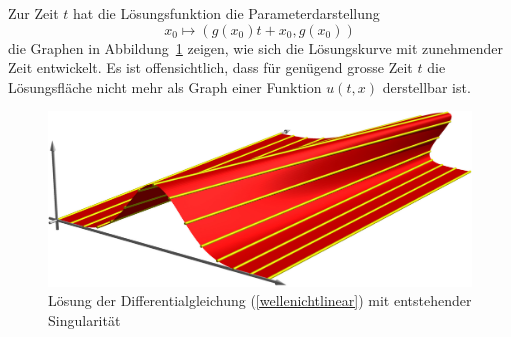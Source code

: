 Zur Zeit $t$ hat die Lösungsfunktion die Parameterdarstellung
\[
x_0\mapsto (g(x_0)t+x_0,g(x_0))
\]
die Graphen in Abbildung~\ref{g} zeigen, wie sich die Lösungskurve
mit zunehmender Zeit entwickelt.
Es ist offensichtlich, dass für genügend grosse Zeit $t$ die
Lösungsfläche nicht mehr als Graph einer Funktion $u(t,x)$ derstellbar ist.
\begin{figure}
\begin{center}
\includegraphics[width=\hsize]{../common/graphics/welle.jpg}
\end{center}
\caption{Lösung der Differentialgleichung (\ref{wellenichtlinear}) mit
entstehender Singularität\label{g}}
\end{figure}


